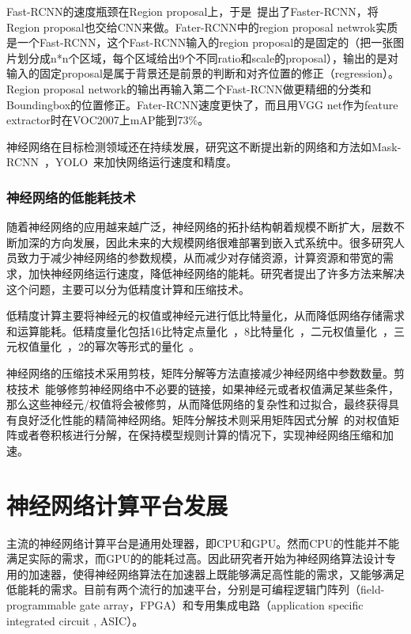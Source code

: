 Fast-RCNN的速度瓶颈在Region proposal上，于是~\citet{ren2015faster}提出了Faster-RCNN，将Region proposal也交给CNN来做。Fater-RCNN中的region proposal netwrok实质是一个Fast-RCNN，这个Fast-RCNN输入的region proposal的是固定的（把一张图片划分成n*n个区域，每个区域给出9个不同ratio和scale的proposal），输出的是对输入的固定proposal是属于背景还是前景的判断和对齐位置的修正（regression）。Region proposal network的输出再输入第二个Fast-RCNN做更精细的分类和Boundingbox的位置修正。Fater-RCNN速度更快了，而且用VGG net作为feature extractor时在VOC2007上mAP能到$73\%$。

神经网络在目标检测领域还在持续发展，研究这不断提出新的网络和方法如Mask-RCNN~\cite{he2017mask}，YOLO~\cite{redmon2016you}来加快网络运行速度和精度。


\subsubsection{神经网络的低能耗技术}
随着神经网络的应用越来越广泛，神经网络的拓扑结构朝着规模不断扩大，层数不断加深的方向发展，因此未来的大规模网络很难部署到嵌入式系统中。很多研究人员致力于减少神经网络的参数规模，从而减少对存储资源，计算资源和带宽的需求，加快神经网络运行速度，降低神经网络的能耗。研究者提出了许多方法来解决这个问题，主要可以分为低精度计算和压缩技术。

低精度计算主要将神经元的权值或神经元进行低比特量化，从而降低网络存储需求和运算能耗。低精度量化包括16比特定点量化~\cite{gupta2015deep}，8比特量化~\cite{dettmers20158}，二元权值量化~\cite{courbariaux2015binaryconnect}，三元权值量化~\cite{rastegari2016xnor}，2的幂次等形式的量化~\cite{zhou2017incremental}。

神经网络的压缩技术采用剪枝，矩阵分解等方法直接减少神经网络中参数数量。剪枝技术~\cite{reed1993pruning, lecun1989optimal, miche2010op, han2015learning}能够修剪神经网络中不必要的链接，如果神经元或者权值满足某些条件，那么这些神经元/权值将会被修剪，从而降低网络的复杂性和过拟合，最终获得具有良好泛化性能的精简神经网络。矩阵分解技术则采用矩阵因式分解~\cite{denton2014exploiting, lebedev2014speeding}的对权值矩阵或者卷积核进行分解，在保持模型规则计算的情况下，实现神经网络压缩和加速。

\section{神经网络计算平台发展}

主流的神经网络计算平台是通用处理器，即CPU和GPU。然而CPU的性能并不能满足实际的需求，而GPU的的能耗过高。因此研究者开始为神经网络算法设计专用的加速器，使得神经网络算法在加速器上既能够满足高性能的需求，又能够满足低能耗的需求。目前有两个流行的加速平台，分别是可编程逻辑门阵列（field-programmable gate array，FPGA）和专用集成电路（application specific integrated circuit , ASIC）。

